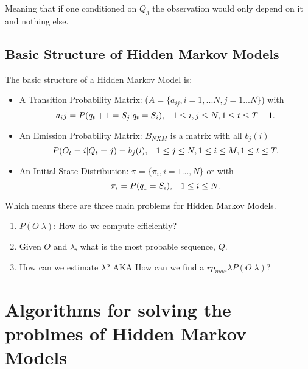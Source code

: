 \documentclass[12pt]{report}
\begin{document}
\HMM{}
\vspace{10 mm}

Meaning that if one conditioned on $Q_3$ the observation would only depend on it and nothing else.

\subsection{Basic Structure of Hidden Markov Models}

The basic structure of a Hidden Markov Model is:

\begin{itemize}
	\item A Transition Probability Matrix: ($A=\{a_{ij}, i=1, ...N, j=1 ...N\}$) with
	\vspace{5 mm}
	\begin{equation}
	a_ij = P(q_t+1 = S_j |q_t = S_i), \hspace {3 mm} 1 \leq i,j \leq N, 1 \leq t \leq T - 1.
	\end{equation}
	\item An Emission Probability Matrix: $B_{NXM}$ is a matrix with all $b_j(i)$
	\vspace{5 mm}
	\begin{equation}
	P(O_t = i|Q_t=j)=b_j(i), \hspace {3 mm} 1 \leq j \leq N, 1 \leq i \leq M, 1 \leq t \leq T.
	\end{equation}
	\item An Initial State Distribution: $\pi = \{\pi_i, i=1 ..., N\}$ or with
	\vspace{5 mm}
	\begin{equation}
	\pi_i = P(q_1 = S_i), \hspace {3 mm} 1 \leq i \leq N.
	\end{equation}
\end{itemize}

\vspace {5 mm}

Which means there are three main problems for Hidden Markov Models.
\begin{enumerate}
 \item $P(O|\lambda)$: How do we compute efficiently?
 \item Given $O$ and $\lambda$, what is the most probable sequence, $Q$.
 \item How can we estimate $\lambda$? AKA How can we find a $rp_{max} \lambda P(O|\lambda)$?
\end{enumerate}

\section{Algorithms for solving the problmes of Hidden Markov Models}
\end{document}

